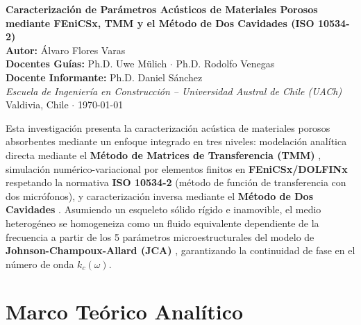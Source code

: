 \documentclass[11pt,a4paper]{article}
\begin{document}
\begin{center}
{\Large \bfseries Caracterización de Parámetros Acústicos de Materiales Porosos} \\[0.4em]
{\large \bfseries mediante FEniCSx, TMM y el Método de Dos Cavidades (ISO 10534-2)} \\[1.2em]

\textbf{Autor:} Álvaro Flores Varas \\[0.5em]
\small
\textbf{Docentes Guías:} Ph.D. Uwe Mülich \quad $\cdot$ \quad Ph.D. Rodolfo Venegas \\[0.2em]
\textbf{Docente Informante:} Ph.D. Daniel Sánchez \\[0.6em]
\textit{Escuela de Ingeniería en Construcción -- Universidad Austral de Chile (UACh)} \\[0.2em]
Valdivia, Chile \quad $\cdot$ \quad \today
\end{center}

\vspace{0.5em}

\begin{resumenbox}
Esta investigación presenta la caracterización acústica de materiales porosos absorbentes mediante un enfoque integrado en tres niveles: modelación analítica directa mediante el \textbf{Método de Matrices de Transferencia (TMM)} \citep{venegas2011}, simulación numérico-variacional por elementos finitos en \textbf{FEniCSx/DOLFINx} respetando la normativa \textbf{ISO 10534-2} \citep{iso10534_2} (método de función de transferencia con dos micrófonos), y caracterización inversa mediante el \textbf{Método de Dos Cavidades} \citep{utsuno1989}. Asumiendo un esqueleto sólido rígido e inamovible, el medio heterogéneo se homogeneiza como un fluido equivalente dependiente de la frecuencia a partir de los 5 parámetros microestructurales del modelo de \textbf{Johnson-Champoux-Allard (JCA)} \citep{johnson1987, champoux1991}, garantizando la continuidad de fase en el número de onda $k_c(\omega)$.
\end{resumenbox}

\vspace{1em}

\section{Marco Teórico Analítico}
\label{sec:marco}
\end{document}
